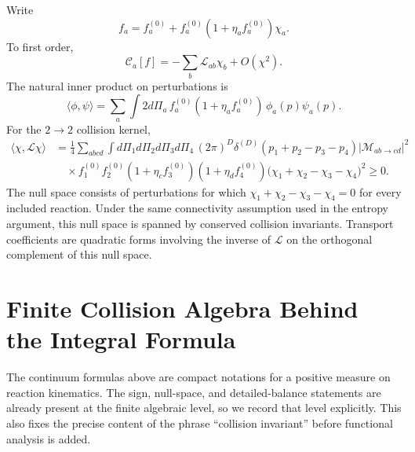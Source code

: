 Write
\begin{equation}
  f_a=f_a^{(0)}+f_a^{(0)}(1+\eta_af_a^{(0)})\chi_a .
  \label{eq:kinetic-linearized-ansatz}
\end{equation}
To first order,
\[
  \mathcal C_a[f]=-\sum_b\mathcal L_{ab}\chi_b+O(\chi^2).
\]
The natural inner product on perturbations is
\begin{equation}
  \langle \phi,\psi\rangle
  =
  \sum_a\int 2d\Pi_a\,
  f_a^{(0)}(1+\eta_af_a^{(0)})\,\phi_a(p)\psi_a(p).
  \label{eq:kinetic-linearized-inner-product}
\end{equation}
For the \(2\to2\) collision kernel,
\begin{align}
  \langle \chi,\mathcal L\chi\rangle
  &=
  \frac14
  \sum_{abcd}\int
  d\Pi_1d\Pi_2d\Pi_3d\Pi_4\,
  (2\pi)^D\delta^{(D)}(p_1+p_2-p_3-p_4)
  |\mathcal M_{ab\to cd}|^2
  \nonumber\\
  &\quad\times
  f_1^{(0)}f_2^{(0)}
  (1+\eta_c f_3^{(0)})(1+\eta_d f_4^{(0)})
  \bigl(\chi_1+\chi_2-\chi_3-\chi_4\bigr)^2\ge0.
  \label{eq:kinetic-linearized-positive-form}
\end{align}
The null space consists of perturbations for which
\(\chi_1+\chi_2-\chi_3-\chi_4=0\) for every included reaction.  Under the
same connectivity assumption used in the entropy argument, this null space
is spanned by conserved collision invariants.  Transport coefficients are
quadratic forms involving the inverse of \(\mathcal L\) on the orthogonal
complement of this null space.

\section{Finite Collision Algebra Behind the Integral Formula}
\label{sec:finite-collision-algebra-behind-kinetic-integral}

The continuum formulas above are compact notations for a positive measure on
reaction kinematics.  The sign, null-space, and detailed-balance statements
are already present at the finite algebraic level, so we record that level
explicitly.  This also fixes the precise content of the phrase ``collision
invariant'' before functional analysis is added.

